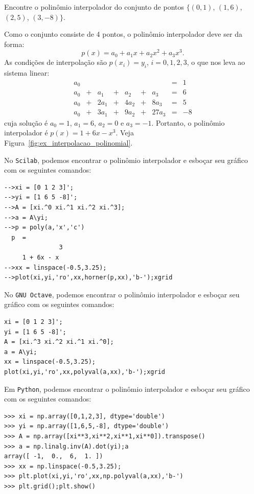 \begin{ex}\label{ex:interpolacao_polinomial} Encontre o polinômio interpolador do conjunto de pontos $\{(0, 1)$, $(1, 6)$, $(2, 5)$, $(3, -8)\}$.
\end{ex}
\begin{sol}
Como o conjunto consiste de 4 pontos, o polinômio interpolador deve ser da forma:
\begin{equation*}
  p(x) = a_0 + a_1x + a_2x^2 + a_3x^3.
\end{equation*}
As condições de interpolação são $p(x_i) = y_i$, $i = 0, 1, 2, 3$, o que nos leva ao sistema linear:
\begin{equation*}
  \begin{array}{lclclclcl}
    a_0& & & & & & &=&1\\
    a_0&+& a_1&+& a_2&+&  a_3&=&6\\
    a_0&+&2a_1&+&4a_2&+& 8a_3&=&5\\
    a_0&+&3a_1&+&9a_2&+&27a_3&=&-8
  \end{array}
\end{equation*}
cuja solução é $a_0=1$, $a_1=6$, $a_2=0$ e $a_3=-1$. Portanto, o polinômio interpolador é $p(x)=1+6x-x^3$. Veja Figura~\ref{fig:ex_interpolacao_polinomial}.

\ifisscilab
No \verb+Scilab+, podemos encontrar o polinômio interpolador e esboçar seu gráfico com os seguintes comandos:
\begin{verbatim}
-->xi = [0 1 2 3]';
-->yi = [1 6 5 -8]';
-->A = [xi.^0 xi.^1 xi.^2 xi.^3];
-->a = A\yi;
-->p = poly(a,'x','c')
  p  =
               3
     1 + 6x - x
-->xx = linspace(-0.5,3.25);
-->plot(xi,yi,'ro',xx,horner(p,xx),'b-');xgrid
\end{verbatim}
\fi
\ifisoctave
No \verb+GNU Octave+, podemos encontrar o polinômio interpolador e esboçar seu gráfico com os seguintes comandos:
\begin{verbatim}
xi = [0 1 2 3]';
yi = [1 6 5 -8]';
A = [xi.^3 xi.^2 xi.^1 xi.^0];
a = A\yi;
xx = linspace(-0.5,3.25);
plot(xi,yi,'ro',xx,polyval(a,xx),'b-');xgrid
\end{verbatim}
\fi
\ifispython
Em \verb+Python+, podemos encontrar o polinômio interpolador e esboçar seu gráfico com os seguintes comandos:
\begin{verbatim}
>>> xi = np.array([0,1,2,3], dtype='double')
>>> yi = np.array([1,6,5,-8], dtype='double')
>>> A = np.array([xi**3,xi**2,xi**1,xi**0]).transpose()
>>> a = np.linalg.inv(A).dot(yi);a
array([ -1,  0.,  6,  1. ])
>>> xx = np.linspace(-0.5,3.25);
>>> plt.plot(xi,yi,'ro',xx,np.polyval(a,xx),'b-')
>>> plt.grid();plt.show()
\end{verbatim}
\fi
\end{sol}


